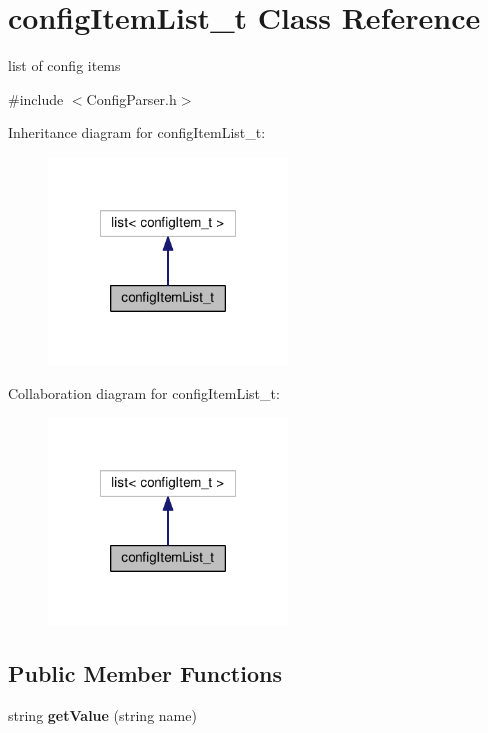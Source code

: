 \hypertarget{classconfigItemList__t}{}\section{config\+Item\+List\+\_\+t Class Reference}
\label{classconfigItemList__t}


list of config items  




{\ttfamily \#include $<$Config\+Parser.\+h$>$}



Inheritance diagram for config\+Item\+List\+\_\+t\+:
\nopagebreak
\begin{figure}[H]
\begin{center}
\leavevmode
\includegraphics[width=180pt]{classconfigItemList__t__inherit__graph}
\end{center}
\end{figure}


Collaboration diagram for config\+Item\+List\+\_\+t\+:
\nopagebreak
\begin{figure}[H]
\begin{center}
\leavevmode
\includegraphics[width=180pt]{classconfigItemList__t__coll__graph}
\end{center}
\end{figure}
\subsection*{Public Member Functions}
\begin{DoxyCompactItemize}
\item 
\mbox{\label{classconfigItemList__t_a85b9cc4dfb3d218b3da8678ebf319157}} 
string {\bfseries get\+Value} (string name)
\end{DoxyCompactItemize}


